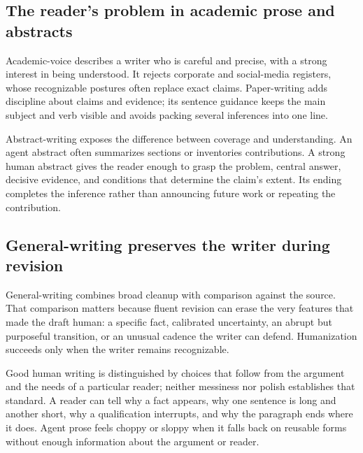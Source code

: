 \subsection{The reader's problem in academic prose and abstracts}

Academic-voice describes a writer who is careful and precise, with a strong
interest in being understood. It rejects corporate and social-media registers,
whose recognizable postures often replace exact claims. Paper-writing adds
discipline about claims and evidence; its sentence guidance keeps the main
subject and verb visible and avoids packing several inferences into one line.

Abstract-writing exposes the difference between coverage and understanding.
An agent abstract often summarizes sections or inventories contributions. A
strong human abstract gives the reader enough to grasp the problem, central
answer, decisive evidence, and conditions that determine the claim's extent.
Its ending completes the inference rather than announcing future work or
repeating the contribution.

\subsection{General-writing preserves the writer during revision}

General-writing combines broad cleanup with comparison against the source.
That comparison matters because fluent revision can erase the very features
that made the draft human: a specific fact, calibrated uncertainty, an abrupt
but purposeful transition, or an unusual cadence the writer can defend.
Humanization succeeds only when the writer remains recognizable.

Good human writing is distinguished by choices that follow from the argument
and the needs of a particular reader; neither messiness nor polish establishes
that standard. A reader can tell why a fact appears, why one sentence is long
and another short, why a qualification interrupts, and why the paragraph ends
where it does. Agent prose feels choppy or sloppy when it falls back on reusable
forms without enough information about the argument or reader.
